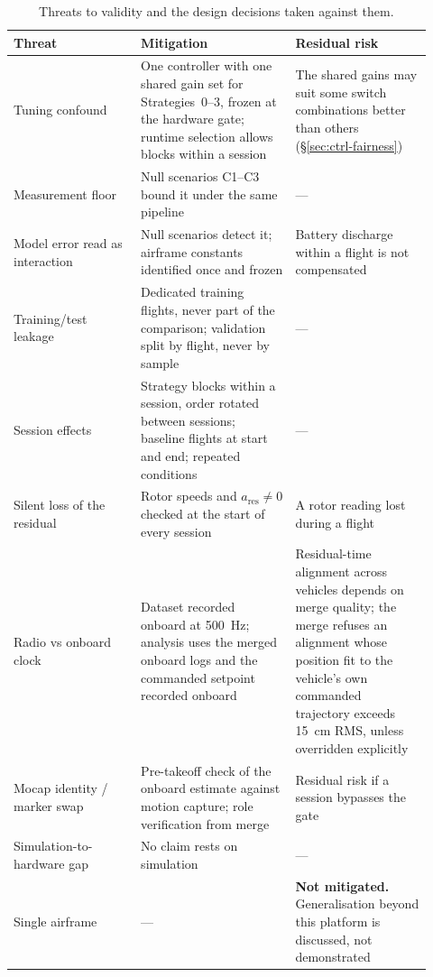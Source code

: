 \begin{table}[t]
  \centering
  \caption{Threats to validity and the design decisions taken against them.}
  \label{tab:setup-threats}
  \small
  \begin{tabular}{@{}p{0.28\linewidth}p{0.34\linewidth}p{0.30\linewidth}@{}}
    \toprule
    Threat & Mitigation & Residual risk \\
    \midrule
    Tuning confound & One controller with one shared gain set for Strategies~0--3, frozen at the hardware gate; runtime selection allows blocks within a session & The shared gains may suit some switch combinations better than others (§\ref{sec:ctrl-fairness}) \\
    Measurement floor & Null scenarios C1--C3 bound it under the same pipeline & --- \\
    Model error read as interaction & Null scenarios detect it; airframe constants identified once and frozen & Battery discharge within a flight is not compensated \\
    Training/test leakage & Dedicated training flights, never part of the comparison; validation split by flight, never by sample & --- \\
    Session effects & Strategy blocks within a session, order rotated between sessions; baseline flights at start and end; repeated conditions & --- \\
    Silent loss of the residual & Rotor speeds and $a_{\mathrm{res}} \neq 0$ checked at the start of every session & A rotor reading lost during a flight \\
    Radio vs onboard clock & Dataset recorded onboard at \SI{500}{\hertz}; analysis uses the merged onboard logs and the commanded setpoint recorded onboard & Residual-time alignment across vehicles depends on merge quality; the merge refuses an alignment whose position fit to the vehicle's own commanded trajectory exceeds \SI{15}{\centi\metre} RMS, unless overridden explicitly \\
    Mocap identity / marker swap & Pre-takeoff check of the onboard estimate against motion capture; role verification from merge & Residual risk if a session bypasses the gate \\
    Simulation-to-hardware gap & No claim rests on simulation & --- \\
    Single airframe & --- & \textbf{Not mitigated.} Generalisation beyond this platform is discussed, not demonstrated \\
    \bottomrule
  \end{tabular}
\end{table}

